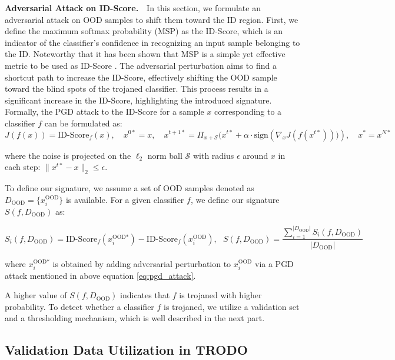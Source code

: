 \textbf{Adversarial Attack on ID-Score.}\ \ In this section, we formulate an adversarial attack on OOD samples to shift them toward the ID region. First, we define the maximum softmax probability (MSP) as the ID-Score, which is an indicator of the classifier's confidence in recognizing an input sample belonging to the ID. Noteworthy that it has been shown that MSP is a simple yet effective metric to be used as ID-Score \cite{msp}. The adversarial perturbation aims to find a shortcut path to increase the ID-Score, effectively shifting the OOD sample toward the blind spots of the trojaned classifier. This process results in a significant increase in the ID-Score, highlighting the introduced signature. Formally, the PGD attack to the ID-Score for a sample $x$ corresponding to a classifier $f$ can be formulated as:
{\small
\begin{equation}
J(f(x)) = \text{ID-Score}_{f}(x), \quad
    x^{0*} = x, \quad 
    x^{t+1*} = \Pi_{x+\mathcal{S}} (x^{t*} + \alpha \cdot \text{sign}\left(\nabla_x J(f(x^{t*}))) \right), \quad
    x^{*} = x^{N*}
    \label{eq:pgd_attack}
\end{equation}}


where the noise is projected on the $\ell_{2}$ norm ball $\mathcal{S}$ with radius $\epsilon$ around $x$ in each step: $ \|x^{t*} - x\|_2 \leq \epsilon$.

To define our signature, we assume a set of OOD samples denoted as $D_{\text{OOD}} = \{ x_i^{\text{OOD}} \}$ is available. For a given classifier $f$, we define our signature $S(f, D_{\text{OOD}})$ as:

{\small
\begin{equation}
    S_i(f, D_{\text{OOD}}) = 
    \text{ID-Score}_{f}(x_i^{\text{OOD*}}) - \text{ID-Score}_{f}(x_i^{\text{OOD}}), \ \ \ 
    S(f, D_{\text{OOD}})=\frac{\sum_{i=1}^{|D_{\text{OOD}}|} S_i(f, D_{\text{OOD}})}{|D_{\text{OOD}}|}
    \label{eq:signal}
\end{equation}}

where $x_i^{\text{OOD*}}$ is obtained by adding adversarial perturbation to $x_i^{\text{OOD}}$ via a PGD attack mentioned in above equation \ref{eq:pgd_attack}.

A higher value of $S(f, D_{\text{OOD}})$ indicates that $f$ is trojaned with higher probability. To detect whether a classifier $f$ is trojaned, we utilize a validation set and a thresholding mechanism, which is well described in the next part. 

\subsection{Validation Data Utilization in TRODO}

